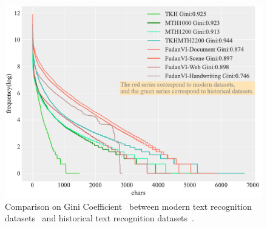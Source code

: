 \begin{figure}[!t]
	\centering
	\includegraphics[width=\linewidth]{figures/database_long_tail.pdf}
	\caption
    {Comparison on Gini Coefficient~\cite{tailsurvey} between modern text recognition datasets~\cite{fudanvi} and historical text recognition datasets~\cite{tkhmth}.}
	\label{fig:moretailed}
\end{figure}